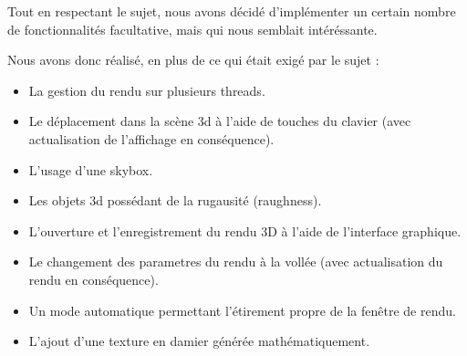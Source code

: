 Tout en respectant le sujet, nous avons décidé d'implémenter un certain nombre de fonctionnalités facultative, mais qui nous semblait intéréssante.

Nous avons donc réalisé, en plus de ce qui était exigé par le sujet :
\begin{itemize}
    \item La gestion du rendu sur plusieurs threads.
    \item Le déplacement dans la scène 3d à l'aide de touches du clavier (avec actualisation de l'affichage en conséquence).
    \item L'usage d'une skybox.
    \item Les objets 3d possédant de la rugausité (raughness).
    \item L'ouverture et l'enregistrement du rendu 3D à l'aide de l'interface graphique.
    \item Le changement des parametres du rendu à la vollée (avec actualisation du rendu en conséquence).
    \item Un mode automatique permettant l'étirement propre de la fenêtre de rendu.
    \item L'ajout d'une texture en damier générée mathématiquement.
\end{itemize}
